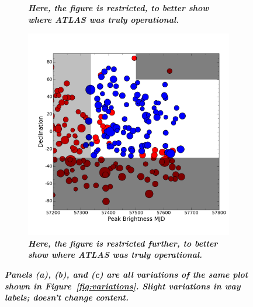 \begin{figure}
\begin{subfigure}{.5\textwidth}
		\caption{\it \small{{\bf Here, the figure is restricted, to better show where ATLAS was truly operational.}}}
		\label{fig:var6}
	\end{subfigure}
	\begin{subfigure}{.5\textwidth}
	  \centering
			\includegraphics[width=1\linewidth]{figures/variations/plot2useinPaper_restrictxfurther.png}
		\caption{\it \small{{\bf Here, the figure is restricted further, to better show where ATLAS was truly operational.}}}
		\label{fig:var7}
	\end{subfigure}%
	\caption{\it \small{{\bf Panels (a), (b), and (c) are all variations of the same plot shown in Figure~\ref{fig:variations}. Slight variations in way labels; doesn't change content.}}}
	\label{fig:variations2}
\end{figure}




